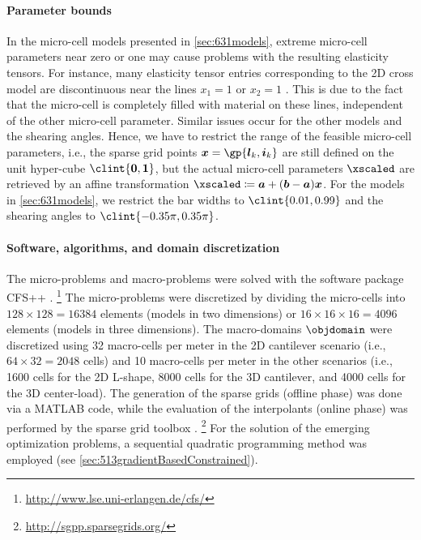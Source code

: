 \paragraph{Parameter bounds}

In the micro-cell models presented in \cref{sec:631models},
extreme micro-cell parameters near zero or one may cause problems
with the resulting elasticity tensors.
For instance, many elasticity tensor entries corresponding to
the 2D cross model are discontinuous near the lines $x_1 = 1$ or $x_2 = 1$
.
This is due to the fact that the micro-cell is completely filled with material
on these lines,
independent of the other micro-cell parameter.
Similar issues occur for the other models and the shearing angles.
Hence, we have to restrict the range of the feasible micro-cell parameters,
i.e., the sparse grid points
$\*x = \gp{\*l_k,\*i_k}$ are still defined on the unit hyper-cube
$\clint{\*0, \*1}$,
but the actual micro-cell parameters $\xscaled$ are retrieved by an
affine transformation $\xscaled \ceq \*a + (\*b - \*a) \*x$.
For the models in \cref{sec:631models},
we restrict the bar widths to $\clint{0.01, 0.99}$ and
the shearing angles to $\clint{-0.35\pi, 0.35\pi}$.

\paragraph{Software, algorithms, and domain discretization}

The micro-problems and macro-problems were solved with the
\fem software package CFS++ \cite{Kaltenbacher10Advanced}.%
\footnote{%
  \url{http://www.lse.uni-erlangen.de/cfs/}%
}
The micro-prob\-lems were discretized by dividing the micro-cells into
$128 \times 128 = \num{16384}$ elements (models in two dimensions) or
$16 \times 16 \times 16 = \num{4096}$ elements (models in three dimensions).
The macro-domains $\objdomain$ were discretized using
32 macro-cells per meter in the 2D cantilever scenario
(i.e., $64 \times 32 = 2048$ cells) and
10 macro-cells per meter in the other scenarios
(i.e.,
\num{1600} cells for the 2D L-shape,
\num{8000} cells for the 3D cantilever, and
\num{4000} cells for the 3D center-load).
The generation of the sparse grids (offline phase) was done via a MATLAB code,
while the evaluation of the interpolants (online phase) was performed
by the sparse grid toolbox \sgpp \cite{Pflueger10Spatially}.%
\footnote{%
  \url{http://sgpp.sparsegrids.org/}%
}
For the solution of the emerging optimization problems,
a sequential quadratic programming method was employed
(see \cref{sec:513gradientBasedConstrained}).




